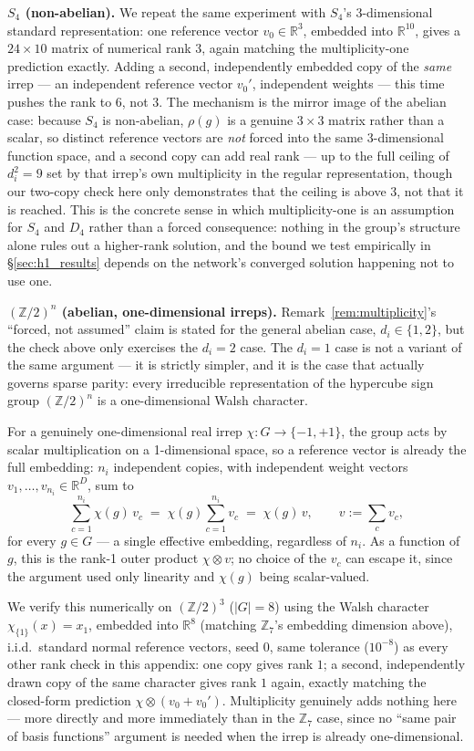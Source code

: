 \documentclass{article}
\begin{document}
\textbf{$S_4$ (non-abelian).} We repeat the same experiment with $S_4$'s
$3$-dimensional standard representation: one reference vector
$v_0\in\mathbb{R}^3$, embedded into $\mathbb{R}^{10}$, gives a $24\times
10$ matrix of numerical rank $3$, again matching the multiplicity-one
prediction exactly. Adding a second, independently embedded copy of the
\emph{same} irrep --- an independent reference vector $v_0'$, independent
weights --- this time pushes the rank to $6$, not $3$. The mechanism is
the mirror image of the abelian case: because $S_4$ is non-abelian,
$\rho(g)$ is a genuine $3\times 3$ matrix rather than a scalar, so distinct
reference vectors are \emph{not} forced into the same $3$-dimensional
function space, and a second copy can add real rank --- up to the full
ceiling of $d_i^2=9$ set by that irrep's own multiplicity in the regular
representation, though our two-copy check here only demonstrates that the
ceiling is above $3$, not that it is reached. This is the concrete sense in
which multiplicity-one is an assumption for $S_4$ and $D_4$ rather than a
forced consequence: nothing in the group's structure alone rules out a
higher-rank solution, and the bound we test empirically in
\S\ref{sec:h1_results} depends on the network's converged solution
happening not to use one.

\textbf{$(\mathbb{Z}/2)^n$ (abelian, one-dimensional irreps).} Remark~\ref{rem:multiplicity}'s
``forced, not assumed'' claim is stated for the general abelian case,
$d_i\in\{1,2\}$, but the check above only exercises the $d_i=2$ case. The
$d_i=1$ case is not a variant of the same argument --- it is strictly
simpler, and it is the case that actually governs sparse parity: every
irreducible representation of the hypercube sign group $(\mathbb{Z}/2)^n$
is a one-dimensional Walsh character.

For a genuinely one-dimensional real irrep $\chi: G \to \{-1,+1\}$, the
group acts by scalar multiplication on a 1-dimensional space, so a
reference vector is already the full embedding: $n_i$ independent copies,
with independent weight vectors $v_1,\ldots,v_{n_i}\in\mathbb{R}^D$, sum to
\[
\sum_{c=1}^{n_i} \chi(g)\,v_c \;=\; \chi(g)\sum_{c=1}^{n_i} v_c \;=\; \chi(g)\,v,
\qquad v := \textstyle\sum_c v_c,
\]
for every $g\in G$ --- a single effective embedding, regardless of $n_i$.
As a function of $g$, this is the rank-1 outer product $\chi \otimes v$; no
choice of the $v_c$ can escape it, since the argument used only linearity
and $\chi(g)$ being scalar-valued.

We verify this numerically on $(\mathbb{Z}/2)^3$ ($|G|=8$) using the Walsh
character $\chi_{\{1\}}(x)=x_1$, embedded into $\mathbb{R}^8$ (matching
$\mathbb{Z}_7$'s embedding dimension above), i.i.d.\ standard normal
reference vectors, seed $0$, same tolerance ($10^{-8}$) as every other
rank check in this appendix: one copy gives rank $1$; a second,
independently drawn copy of the same character gives rank $1$ again,
exactly matching the closed-form prediction $\chi\otimes(v_0+v_0')$.
Multiplicity genuinely adds nothing here --- more directly and more
immediately than in the $\mathbb{Z}_7$ case, since no ``same pair of basis
functions'' argument is needed when the irrep is already one-dimensional.
\end{document}
